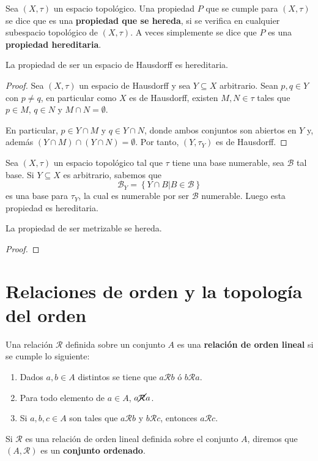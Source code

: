 \documentclass[12pt]{report}
\theoremstyle{largebreak}
\begin{document}
    \begin{mydef}
        Sea $(X,\tau)$ un espacio topológico. Una propiedad $P$ que se cumple para $(X,\tau)$ se dice que es una \textbf{propiedad que se hereda}, si se verifica en cualquier subespacio topológico de $(X,\tau)$. A veces simplemente se dice que $P$ es una \textbf{propiedad hereditaria}.
    \end{mydef}

    \begin{exa}
        La propiedad de ser un espacio de Hausdorff es hereditaria.
    \end{exa}

    \begin{proof}
        Sea $(X,\tau)$ un espacio de Hausdorff y sea $Y\subseteq X$ arbitrario. Sean $p,q\in Y$ con $p\neq q$, en particular como $X$ es de Hausdorff, existen $M,N\in\tau$ tales que $p\in M$, $q\in N$ y $M\cap N=\emptyset$.

        En particular, $p\in Y\cap M$ y $q\in Y\cap N$, donde ambos conjuntos son abiertos en $Y$ y, además $(Y\cap M)\cap (Y\cap N)=\emptyset$. Por tanto, $(Y,\tau_Y)$ es de Hausdorff.
    \end{proof}

    \begin{exa}
        Sea $(X,\tau)$ un espacio topológico tal que $\tau$ tiene una base numerable, sea $\mathcal{B}$ tal base. Si $Y\subseteq X$ es arbitrario, sabemos que
        \begin{equation*}
            \mathcal{B}_Y=\left\{Y\cap B\Big|B\in\mathcal{B} \right\}
        \end{equation*}
        es una base para $\tau_Y$, la cual es numerable por ser $\mathcal{B}$ numerable. Luego esta propiedad es hereditaria.
    \end{exa}

    \begin{excer}
        La propiedad de ser metrizable se hereda.
    \end{excer}

    \begin{proof}
        
    \end{proof}

    \section{Relaciones de orden y la topología del orden}

    \begin{mydef}
        Una relación $\mathcal{R}$ definida sobre un conjunto $A$ es una \textbf{relación de orden lineal} si se cumple lo siguiente:
        \begin{enumerate}
            \item Dados $a,b\in A$ distintos se tiene que $a\mathcal{R}b$ ó $b\mathcal{R}a$.
            \item Para todo elemento de $a\in A$, $a\cancel{\mathcal{R}}a$.
            \item Si $a,b,c\in A$ son tales que $a\mathcal{R}b$ y $b\mathcal{R}c$, entonces $a\mathcal{R}c$.
        \end{enumerate}
    \end{mydef}

    \begin{mydef}
        Si $\mathcal{R}$ es una relación de orden lineal definida sobre el conjunto $A$, diremos que $(A,\mathcal{R})$ es un \textbf{conjunto ordenado}.
    \end{mydef}
\end{document}
